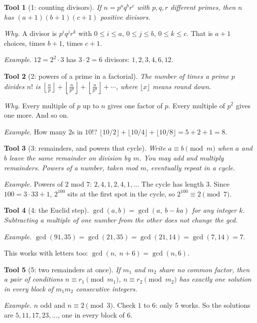 \documentclass[11pt]{article}
\newtheorem*{tool}{Tool}
\begin{document}
\begin{tool}[1: counting divisors]
If $n = p^a q^b r^c$ with $p, q, r$ different primes, then $n$ has $(a+1)(b+1)(c+1)$ positive divisors.
\end{tool}
\noindent\emph{Why.} A divisor is $p^i q^j r^k$ with $0 \le i \le a$, $0 \le j \le b$, $0 \le k \le c$. That is $a+1$ choices, times $b+1$, times $c+1$.

\noindent\emph{Example.} $12 = 2^2 \cdot 3$ has $3 \cdot 2 = 6$ divisors: $1, 2, 3, 4, 6, 12$.

\begin{tool}[2: powers of a prime in a factorial]
The number of times a prime $p$ divides $n!$ is
$\left\lfloor \frac{n}{p} \right\rfloor + \left\lfloor \frac{n}{p^2} \right\rfloor + \left\lfloor \frac{n}{p^3} \right\rfloor + \cdots$, where $\lfloor x \rfloor$ means round down.
\end{tool}
\noindent\emph{Why.} Every multiple of $p$ up to $n$ gives one factor of $p$. Every multiple of $p^2$ gives one more. And so on.

\noindent\emph{Example.} How many $2$s in $10!$? $\lfloor 10/2 \rfloor + \lfloor 10/4 \rfloor + \lfloor 10/8 \rfloor = 5 + 2 + 1 = 8$.

\begin{tool}[3: remainders, and powers that cycle]
Write $a \equiv b \pmod m$ when $a$ and $b$ leave the same remainder on division by $m$. You may add and multiply remainders. Powers of a number, taken mod $m$, eventually repeat in a cycle.
\end{tool}
\noindent\emph{Example.} Powers of $2$ mod $7$: $2, 4, 1, 2, 4, 1, \dots$ The cycle has length $3$. Since $100 = 3 \cdot 33 + 1$, $2^{100}$ sits at the first spot in the cycle, so $2^{100} \equiv 2 \pmod 7$.

\begin{tool}[4: the Euclid step]
$\gcd(a, b) = \gcd(a,\ b - ka)$ for any integer $k$. Subtracting a multiple of one number from the other does not change the gcd.
\end{tool}
\noindent\emph{Example.} $\gcd(91, 35) = \gcd(21, 35) = \gcd(21, 14) = \gcd(7, 14) = 7$.

\noindent This works with letters too: $\gcd(n,\ n + 6) = \gcd(n, 6)$.

\begin{tool}[5: two remainders at once]
If $m_1$ and $m_2$ share no common factor, then a pair of conditions $n \equiv r_1 \pmod{m_1}$, $n \equiv r_2 \pmod{m_2}$ has exactly one solution in every block of $m_1 m_2$ consecutive integers.
\end{tool}
\noindent\emph{Example.} $n$ odd and $n \equiv 2 \pmod 3$. Check $1$ to $6$: only $5$ works. So the solutions are $5, 11, 17, 23, \dots$, one in every block of $6$.
\end{document}
